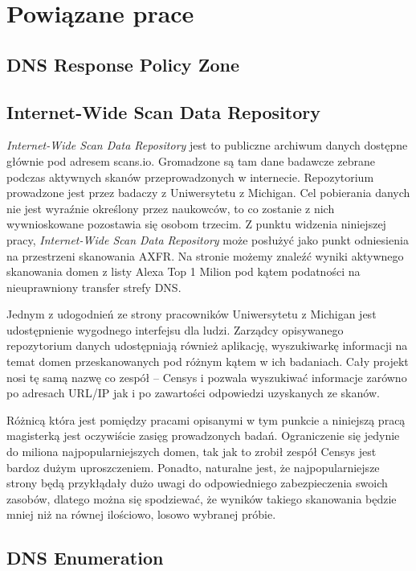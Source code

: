 \chapter{Powiązane prace}

\section{DNS Response Policy Zone}

\section{Internet-Wide Scan Data Repository}
\textit{Internet-Wide Scan Data Repository} jest to publiczne archiwum danych dostępne głównie pod adresem scans.io\cite{scansio}. Gromadzone są tam dane badawcze zebrane podczas aktywnych skanów przeprowadzonych w internecie. Repozytorium prowadzone jest przez badaczy z Uniwersytetu z Michigan\cite{teamcensys}. Cel pobierania danych nie jest wyraźnie określony przez naukowców, to co zostanie z nich wywnioskowane pozostawia się osobom trzecim. Z punktu widzenia niniejszej pracy, \textit{Internet-Wide Scan Data Repository} może posłużyć jako punkt odniesienia na przestrzeni skanowania AXFR. Na stronie możemy znaleźć wyniki aktywnego skanowania domen z listy Alexa Top 1 Milion\cite{alexa} pod kątem podatności na nieuprawniony transfer strefy DNS.

Jednym z udogodnień ze strony pracowników Uniwersytetu z Michigan jest udostępnienie wygodnego interfejsu dla ludzi. Zarządcy opisywanego repozytorium danych udostępniają również aplikację, wyszukiwarkę informacji na temat domen przeskanowanych pod różnym kątem w ich badaniach. Cały projekt nosi tę samą nazwę co zespół -- Censys\cite{censys} i pozwala wyszukiwać informacje zarówno po adresach URL/IP jak i po zawartości odpowiedzi uzyskanych ze skanów.

Różnicą która jest pomiędzy pracami opisanymi w tym punkcie a niniejszą pracą magisterką jest oczywiście zasięg prowadzonych badań. Ograniczenie się jedynie do miliona najpopularniejszych domen, tak jak to zrobił zespół Censys\cite{censys} jest bardoz dużym uproszczeniem. Ponadto, naturalne jest, że najpopularniejsze strony będą przykłądały dużo uwagi do odpowiedniego zabezpieczenia swoich zasobów, dlatego można się spodziewać, że wyników takiego skanowania będzie mniej niż na równej ilościowo, losowo wybranej próbie. 

\section{DNS Enumeration}
